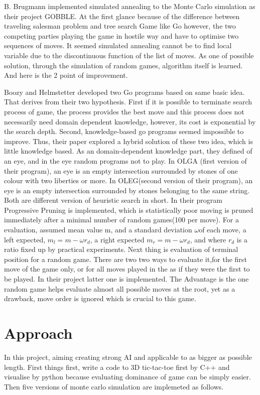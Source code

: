 \documentclass[11pt]{article}
\begin{document}
B. Brugmann implemented simulated annealing to the Monte Carlo simulation as their project GOBBLE\cite{brugmann1993monte}. At the first glance because of the difference between traveling salesman problem and tree search Game like Go however, the two competing parties playing the game in hostile way and have to optimise two sequences of moves. It seemed simulated annealing cannot be to find local variable due to the discontinuous function of the list of moves. As one of possible solution, through the simulation of random games, algorithm itself is learned. And here is the 2 point of improvement. 

Boozy and Helmstetter developed two Go programs based on same basic idea\cite{bouzy2004monte}. That derives from their two hypothesis. First if it is possible to terminate search process of game, the process provides the best move and this process does not necessarily need domain dependent knowledge, however, its cost is exponential by the search depth. Second, knowledge-based go programs seemed impossible to improve. Thus, their paper explored a hybrid solution of these two idea, which is little knowledge based. As an domain-dependent knowledge part, they defined of an {eye}, and in the {eye} random programs not to play. In OLGA (first version of their program), {an eye is an empty intersection surrounded by stones of one colour with two liberties or more.}
In OLEG(second version of their program), {an eye is an empty intersection surrounded by stones belonging to the same string.} Both are different version of heuristic search in short. In their program Progressive Pruning is implemented, which is statistically poor moving is pruned immediately after a minimal number of random games(100 per move). For a evaluation, assumed mean value m, and a standard deviation \(\omega\)of each move, a left expected, \(m_{l} = m - \omega r_{d}\), a right expected \(m_{r} = m - {\omega} r_{d}\), and where \(r_{d}\) is a ratio fixed up by practical experiments. Next thing is evaluation of terminal position for a random game. There are two two ways to evaluate it,{for the first move of the game only}, or  {for all moves played in the as if they were the first to be played.} In their project latter one is implemented. The Advantage is the one random game helps evaluate almost all possible moves at the root, yet as a drawback, move order is ignored which is crucial to this game. 


\section{Approach}
In this project, aiming creating strong AI and applicable to as bigger as possible length. First things first, write a code to 3D tic-tac-toe first by C++ and visualise by python because evaluating dominance of game can be simply easier. Then five versions of monte carlo simulation are implemeted as follows.
\end{document}
